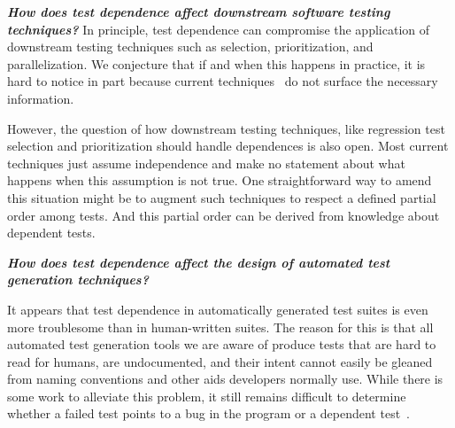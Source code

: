 

\vspace{1mm}

\noindent \textbf{\textit{How does 
test dependence affect downstream software testing techniques?}}
In principle, test dependence can compromise
the application of downstream testing techniques such as selection,
prioritization, and parallelization.  
We conjecture that if and when this happens in practice, it is
hard to notice in part because current techniques~\cite{} do not surface the necessary
information.

However, the question of how downstream testing techniques, like regression test
selection and prioritization should handle dependences is also open.
Most current techniques just assume independence and make no statement
about what happens when this assumption is not true. One
straightforward way to amend this situation might be to augment such
techniques to respect a defined partial order among tests. And this partial order
can be derived from knowledge about dependent tests.

\vspace{1mm}

\noindent \textbf{\textit{How does test dependence
affect the design of automated test generation
techniques?}}

It appears that test dependence in automatically generated test suites is 
even more troublesome than in human-written suites. The reason for this is
that all automated test generation tools we are aware of produce tests
that are hard to read for humans, are undocumented, and their intent
cannot easily be gleaned from naming conventions and other aids
developers normally use. While there is some work to alleviate this problem, it
still remains difficult to determine whether a failed test points to a bug
in the program or a dependent test~\cite{fraseretal:ISSTA:2011}.


\vspace{1mm}

